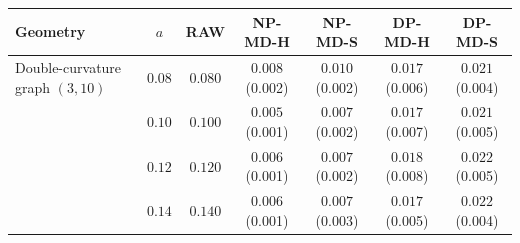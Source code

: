 \begin{tabular}{lcccccc}
\toprule
Geometry & $a$ & RAW & NP-MD-H & NP-MD-S & DP-MD-H & DP-MD-S \\
\midrule
Double-curvature graph $(3,10)$ & $0.08$ & $0.080$ & $0.008$ \scriptsize(0.002) & $0.010$ \scriptsize(0.002) & $0.017$ \scriptsize(0.006) & $0.021$ \scriptsize(0.004) \\
 & $0.10$ & $0.100$ & $0.005$ \scriptsize(0.001) & $0.007$ \scriptsize(0.002) & $0.017$ \scriptsize(0.007) & $0.021$ \scriptsize(0.005) \\
 & $0.12$ & $0.120$ & $0.006$ \scriptsize(0.001) & $0.007$ \scriptsize(0.002) & $0.018$ \scriptsize(0.008) & $0.022$ \scriptsize(0.005) \\
 & $0.14$ & $0.140$ & $0.006$ \scriptsize(0.001) & $0.007$ \scriptsize(0.003) & $0.017$ \scriptsize(0.005) & $0.022$ \scriptsize(0.004) \\
\bottomrule
\end{tabular}

